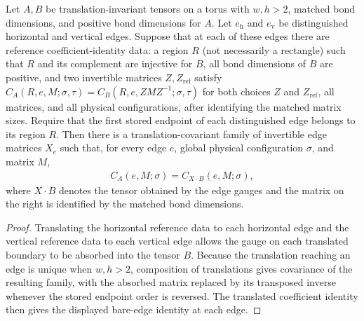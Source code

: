 \begin{lemma}%
    \label{thm:peps_absorbed_family_reference_witnesses}
    \leanok
    Let $A,B$ be translation-invariant tensors on a torus with
    $w,h>2$, matched bond dimensions, and positive bond dimensions
    for $A$. Let $e_{\mathrm h}$ and $e_{\mathrm v}$ be distinguished
    horizontal and vertical edges. Suppose that at each of these
    edges there are reference coefficient-identity data: a region $R$ (not
    necessarily a rectangle) such that
    $R$ and its complement are injective for $B$, all bond dimensions of $B$ are
    positive, and two invertible matrices $Z,Z_{\mathrm{ref}}$ satisfy
    $C_A(R,e,M;\sigma,\tau)=C_B(R,e,Z M Z^{-1};\sigma,\tau)$
    for both choices $Z$ and $Z_{\mathrm{ref}}$, all matrices, and all
    physical configurations, after identifying
    the matched matrix sizes. Require that the first stored endpoint
    of each distinguished edge belongs to its region $R$.
    Then there is a translation-covariant family of invertible edge
    matrices $X_e$ such that, for every edge $e$, global physical
    configuration $\sigma$, and matrix $M$,
    \begin{align}
        C_A(e,M;\sigma)=C_{X\cdot B}(e,M;\sigma),
    \end{align}
    where $X\cdot B$ denotes the tensor obtained by the edge gauges
    and the matrix on the right is identified by the matched bond
    dimensions.
\end{lemma}
\begin{proof}
    \leanok
    Translating the horizontal reference data to each horizontal edge and
    the vertical reference data to each vertical edge allows the gauge on
    each translated boundary to be absorbed into the tensor $B$.
    Because the translation reaching an edge is unique when $w,h>2$,
    composition of translations gives covariance of the
    resulting family, with the absorbed matrix replaced by its transposed
    inverse whenever the stored endpoint order is reversed.
    The translated coefficient identity then gives the displayed
    bare-edge identity at each edge.
\end{proof}
